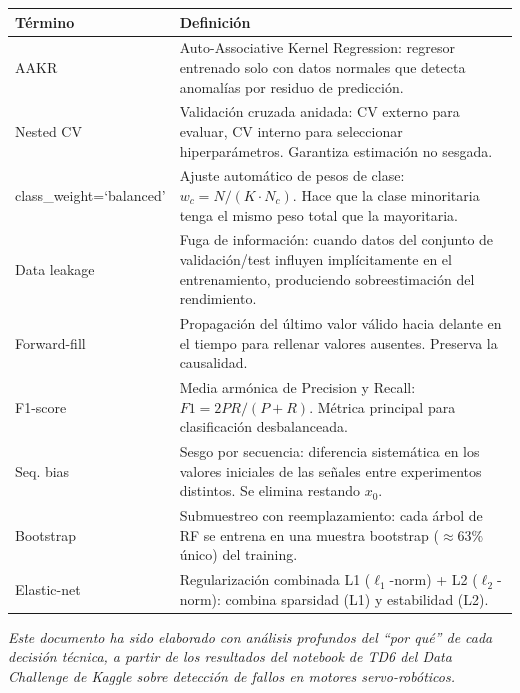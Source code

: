 \documentclass[12pt,a4paper]{article}
\begin{document}
\begin{center}
\begin{tabularx}{\textwidth}{lX}
\toprule
\textbf{T\'{e}rmino} & \textbf{Definici\'{o}n} \\
\midrule
AAKR & Auto-Associative Kernel Regression: regresor entrenado solo con datos normales que detecta anomal\'{i}as por residuo de predicci\'{o}n. \\
\addlinespace
Nested CV & Validaci\'{o}n cruzada anidada: CV externo para evaluar, CV interno para seleccionar hiperpar\'{a}metros. Garantiza estimaci\'{o}n no sesgada. \\
\addlinespace
class\_weight=`balanced' & Ajuste autom\'{a}tico de pesos de clase: $w_c = N/(K \cdot N_c)$. Hace que la clase minoritaria tenga el mismo peso total que la mayoritaria. \\
\addlinespace
Data leakage & Fuga de informaci\'{o}n: cuando datos del conjunto de validaci\'{o}n/test influyen impl\'{i}citamente en el entrenamiento, produciendo sobreestimaci\'{o}n del rendimiento. \\
\addlinespace
Forward-fill & Propagaci\'{o}n del \'{u}ltimo valor v\'{a}lido hacia delante en el tiempo para rellenar valores ausentes. Preserva la causalidad. \\
\addlinespace
F1-score & Media arm\'{o}nica de Precision y Recall: $F1 = 2PR/(P+R)$. M\'{e}trica principal para clasificaci\'{o}n desbalanceada. \\
\addlinespace
Seq. bias & Sesgo por secuencia: diferencia sistem\'{a}tica en los valores iniciales de las se\~{n}ales entre experimentos distintos. Se elimina restando $x_0$. \\
\addlinespace
Bootstrap & Submuestreo con reemplazamiento: cada \'{a}rbol de RF se entrena en una muestra bootstrap ($\approx 63\%$ \'{u}nico) del training. \\
\addlinespace
Elastic-net & Regularizaci\'{o}n combinada L1 ($\ell_1$-norm) + L2 ($\ell_2$-norm): combina sparsidad (L1) y estabilidad (L2). \\
\bottomrule
\end{tabularx}
\end{center}

\vspace{1cm}
\noindent\textit{Este documento ha sido elaborado con an\'{a}lisis profundos del ``por qu\'{e}'' de cada
decisi\'{o}n t\'{e}cnica, a partir de los resultados del notebook de TD6 del Data Challenge de
Kaggle sobre detecci\'{o}n de fallos en motores servo-rob\'{o}ticos.}
\end{document}
